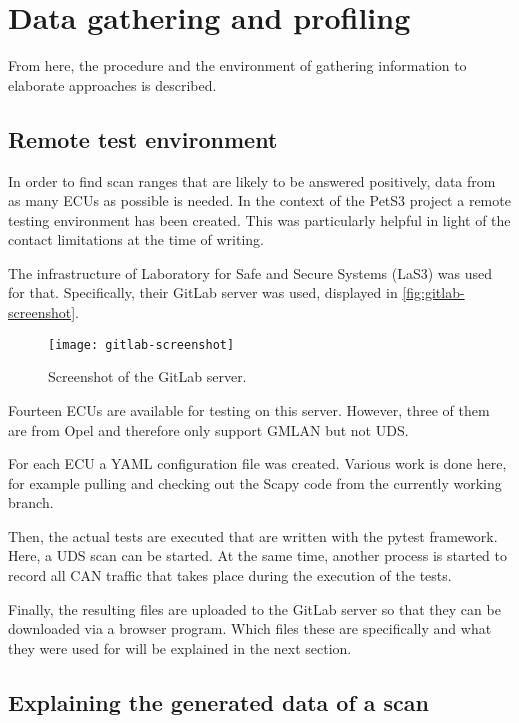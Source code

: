 \chapter{Data gathering and profiling}
\label{sec:data-gathering}

From here, the procedure and the environment of gathering information to elaborate approaches is described.

\section{Remote test environment}

In order to find scan ranges that are likely to be answered positively, data from as many ECUs as possible is needed. In the context of the PetS3 project a remote testing environment has been created. This was particularly helpful in light of the contact limitations at the time of writing.

The infrastructure of Laboratory for Safe and Secure Systems (LaS3) was used for that. Specifically, their GitLab server was used, displayed in \autoref{fig:gitlab-screenshot}.

\begin{figure}[h]
    \centering
    \texttt{[image: gitlab-screenshot]}
    \caption{Screenshot of the GitLab server.}
    \label{fig:gitlab-screenshot}
\end{figure}

Fourteen ECUs are available for testing on this server. However, three of them are from Opel and therefore only support GMLAN but not UDS.

For each ECU a YAML configuration file was created. Various work is done here, for example pulling and checking out the Scapy code from the currently working branch.

Then, the actual tests are executed that are written with the pytest framework. Here, a UDS scan can be started. At the same time, another process is started to record all CAN traffic that takes place during the execution of the tests.

Finally, the resulting files are uploaded to the GitLab server so that they can be downloaded via a browser program. Which files these are specifically and what they were used for will be explained in the next section.

\section{Explaining the generated data of a scan}


